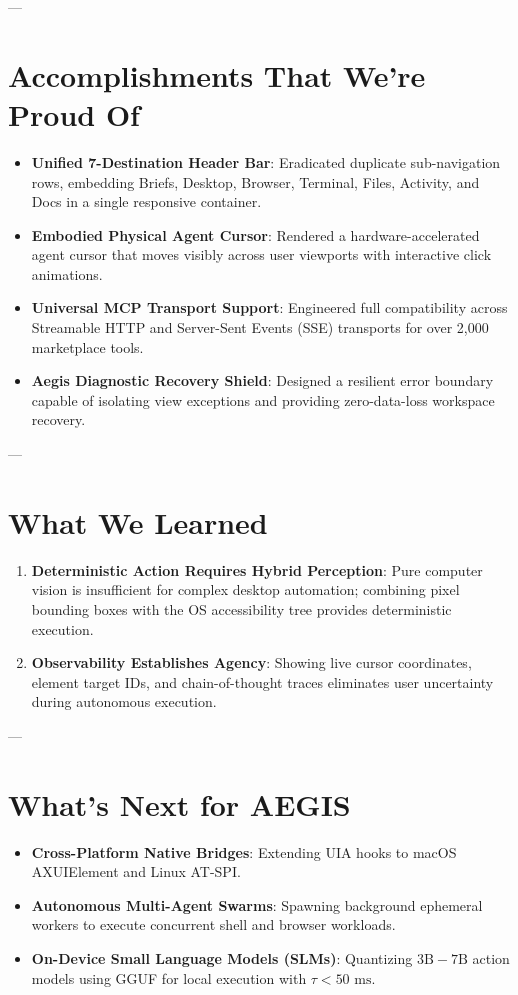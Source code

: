 \documentclass[11pt,a4paper]{article}
\begin{document}
---

\section{Accomplishments That We're Proud Of}

\begin{itemize}
    \item \textbf{Unified 7-Destination Header Bar}: Eradicated duplicate sub-navigation rows, embedding Briefs, Desktop, Browser, Terminal, Files, Activity, and Docs in a single responsive container.
    \item \textbf{Embodied Physical Agent Cursor}: Rendered a hardware-accelerated agent cursor that moves visibly across user viewports with interactive click animations.
    \item \textbf{Universal MCP Transport Support}: Engineered full compatibility across Streamable HTTP and Server-Sent Events (SSE) transports for over 2,000 marketplace tools.
    \item \textbf{Aegis Diagnostic Recovery Shield}: Designed a resilient error boundary capable of isolating view exceptions and providing zero-data-loss workspace recovery.
\end{itemize}

---

\section{What We Learned}

\begin{enumerate}
    \item \textbf{Deterministic Action Requires Hybrid Perception}: Pure computer vision is insufficient for complex desktop automation; combining pixel bounding boxes with the OS accessibility tree provides deterministic execution.
    \item \textbf{Observability Establishes Agency}: Showing live cursor coordinates, element target IDs, and chain-of-thought traces eliminates user uncertainty during autonomous execution.
\end{enumerate}

---

\section{What's Next for AEGIS}

\begin{itemize}
    \item \textbf{Cross-Platform Native Bridges}: Extending UIA hooks to macOS AXUIElement and Linux AT-SPI.
    \item \textbf{Autonomous Multi-Agent Swarms}: Spawning background ephemeral workers to execute concurrent shell and browser workloads.
    \item \textbf{On-Device Small Language Models (SLMs)}: Quantizing $3\text{B}-7\text{B}$ action models using GGUF for local execution with $\tau < 50\text{ ms}$.
\end{itemize}
\end{document}
